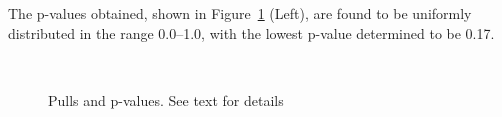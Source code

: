 The p-values obtained, shown in Figure~\ref{fig:fluct} (Left), are found 
to be uniformly distributed in the range 0.0--1.0, with the lowest p-value
determined to be 0.17.

%
\begin{figure}[h!]
  \begin{center}
     \\
    \caption{Pulls and p-values. See text for details}
    \label{fig:fluct}
  \end{center}
\end{figure}

